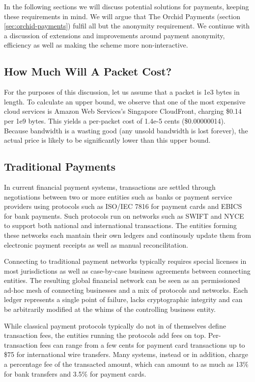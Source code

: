 In the following sections we will discuss potential solutions for payments, keeping these requirements in mind. We will argue that The Orchid Payments (section \ref{sec:orchid-payments}) fulfil all but the anonymity requirement. We continue with a discussion of extensions and improvements around payment anonymity, efficiency as well as making the scheme more non-interactive.

\subsection{How Much Will A Packet Cost?}

For the purposes of this discussion, let us assume that a packet is 1e3 bytes in length. To calculate an upper bound, we observe that one of the most expensive cloud services is Amazon Web Services's Singapore CloudFront, charging \$0.14 per 1e9 bytes. This yields a per-packet cost of 1.4e-5 cents (\$0.00000014). Because bandwidth is a wasting good (any unsold bandwidth is lost forever), the actual price is likely to be significantly lower than this upper bound.

\subsection{Traditional Payments}

In current financial payment systems, transactions are settled through negotiations between two or more entities such as banks or payment service providers\cite{PSP} using protocols such as ISO/IEC 7816\cite{ISO7816} for payment cards and EBICS\cite{EBICS} for bank payments. Such protocols run on networks such as SWIFT\cite{SWIFT} and NYCE\cite{NYCE} to support both national and international transactions. The entities forming these networks each mantain their own ledgers and continously update them from electronic payment receipts as well as manual reconcilitation\cite{Reconcil}.

Connecting to traditional payment networks typically requires special licenses in most jurisdictions as well as case-by-case business agreements between connecting entities. The resulting global financial network can be seen as an permissioned ad-hoc mesh of connecting businesses and a mix of protocols and networks. Each ledger represents a single point of failure, lacks cryptographic integrity and can be arbitrarily modified at the whims of the controlling business entity.

While classical payment protocols typically do not in of themselves define transaction fees, the entities running the protocols add fees on top. Per-transaction fees can range from a few cents for payment card transactions\cite{CardFees1} up to \$75 for international wire transfers\cite{WireTransfers1}. Many systems, instead or in addition, charge a percentage fee of the transacted amount, which can amount to as much as 13\% for bank transfers\cite{WireTransfers2} and 3.5\% for payment cards\cite{CardFees2}.

